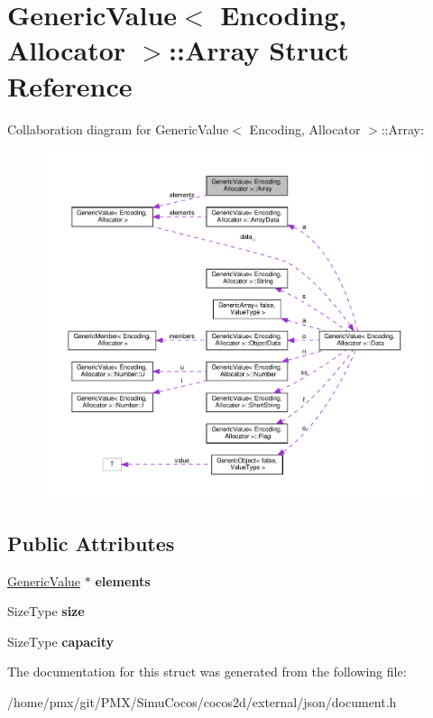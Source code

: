 \hypertarget{structGenericValue_1_1Array}{}\section{Generic\+Value$<$ Encoding, Allocator $>$\+:\+:Array Struct Reference}
\label{structGenericValue_1_1Array}


Collaboration diagram for Generic\+Value$<$ Encoding, Allocator $>$\+:\+:Array\+:
\nopagebreak
\begin{figure}[H]
\begin{center}
\leavevmode
\includegraphics[width=350pt]{structGenericValue_1_1Array__coll__graph}
\end{center}
\end{figure}
\subsection*{Public Attributes}
\begin{DoxyCompactItemize}
\item 
\mbox{\label{structGenericValue_1_1Array_a0af8e50f37486f042ab19fd871d11d4f}} 
\hyperlink{classGenericValue}{Generic\+Value} $\ast$ {\bfseries elements}
\item 
\mbox{\label{structGenericValue_1_1Array_a60f69b3b57b86c20c123c1b080e34bcc}} 
Size\+Type {\bfseries size}
\item 
\mbox{\label{structGenericValue_1_1Array_a2f5dfb089ee750e9405d5adeda4df894}} 
Size\+Type {\bfseries capacity}
\end{DoxyCompactItemize}


The documentation for this struct was generated from the following file\+:\begin{DoxyCompactItemize}
\item 
/home/pmx/git/\+P\+M\+X/\+Simu\+Cocos/cocos2d/external/json/document.\+h\end{DoxyCompactItemize}
